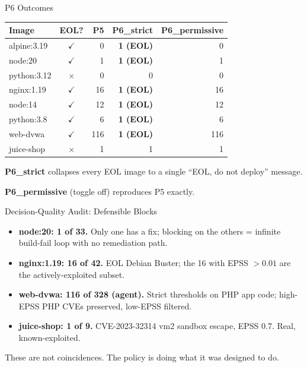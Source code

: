 \documentclass[aspectratio=169]{beamer}
\begin{document}
\begin{frame}{P6 Outcomes}
\small
\begin{tabular}{lcrrr}
\toprule
Image & EOL? & P5 & P6\_strict & P6\_permissive \\
\midrule
alpine:3.19 & \textcolor{eolred}{$\checkmark$} & 0 & \textbf{1 (EOL)} & 0 \\
node:20 & \textcolor{eolred}{$\checkmark$} & 1 & \textbf{1 (EOL)} & 1 \\
python:3.12 & \textcolor{passgreen}{$\times$} & 0 & 0 & 0 \\
nginx:1.19 & \textcolor{eolred}{$\checkmark$} & 16 & \textbf{1 (EOL)} & 16 \\
node:14 & \textcolor{eolred}{$\checkmark$} & 12 & \textbf{1 (EOL)} & 12 \\
python:3.8 & \textcolor{eolred}{$\checkmark$} & 6 & \textbf{1 (EOL)} & 6 \\
web-dvwa & \textcolor{eolred}{$\checkmark$} & 116 & \textbf{1 (EOL)} & 116 \\
juice-shop & \textcolor{passgreen}{$\times$} & 1 & 1 & 1 \\
\bottomrule
\end{tabular}

\medskip
\textbf{P6\_strict} collapses every EOL image to a single ``EOL, do not deploy'' message.

\textbf{P6\_permissive} (toggle off) reproduces P5 exactly.
\end{frame}

\begin{frame}{Decision-Quality Audit: Defensible Blocks}
\begin{itemize}
  \item \textbf{node:20: 1 of 33.} Only one has a fix; blocking on the others = infinite build-fail loop with no remediation path.

  \item \textbf{nginx:1.19: 16 of 42.} EOL Debian Buster; the 16 with EPSS $> 0.01$ are the actively-exploited subset.

  \item \textbf{web-dvwa: 116 of 328 (agent).} Strict thresholds on PHP app code; high-EPSS PHP CVEs preserved, low-EPSS filtered.

  \item \textbf{juice-shop: 1 of 9.} CVE-2023-32314 vm2 sandbox escape, EPSS 0.7. Real, known-exploited.
\end{itemize}

\medskip
These are not coincidences. The policy is doing what it was designed to do.
\end{frame}
\end{document}
